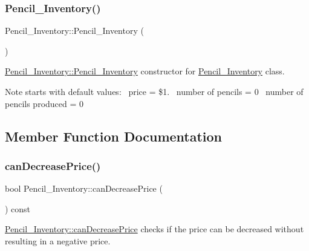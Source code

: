 \subsubsection{\texorpdfstring{Pencil\+\_\+\+Inventory()}{Pencil\_Inventory()}}
{\footnotesize\ttfamily Pencil\+\_\+\+Inventory\+::\+Pencil\+\_\+\+Inventory (\begin{DoxyParamCaption}{ }\end{DoxyParamCaption})}



\hyperlink{classPencil__Inventory_a68480c5a7aa85cee3cb19619115ad552}{Pencil\+\_\+\+Inventory\+::\+Pencil\+\_\+\+Inventory} constructor for \hyperlink{classPencil__Inventory}{Pencil\+\_\+\+Inventory} class. 

\begin{DoxyNote}{Note}
starts with default values\+:~\newline
 price = \$1.~\newline
 number of pencils = 0~\newline
 number of pencils produced = 0~\newline

\end{DoxyNote}


\subsection{Member Function Documentation}
\mbox{\label{classPencil__Inventory_a5c8d580bd32a2ef4b2196da7570203bf}} 
\subsubsection{\texorpdfstring{can\+Decrease\+Price()}{canDecreasePrice()}}
{\footnotesize\ttfamily bool Pencil\+\_\+\+Inventory\+::can\+Decrease\+Price (\begin{DoxyParamCaption}{ }\end{DoxyParamCaption}) const}



\hyperlink{classPencil__Inventory_a5c8d580bd32a2ef4b2196da7570203bf}{Pencil\+\_\+\+Inventory\+::can\+Decrease\+Price} checks if the price can be decreased without resulting in a negative price. 

